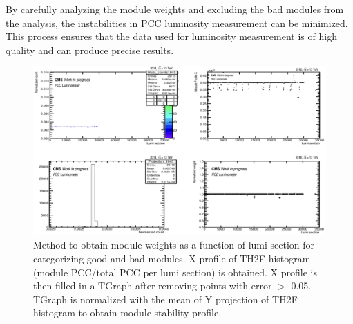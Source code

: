 
By carefully analyzing the module weights and excluding the bad modules from the analysis, the instabilities in PCC luminosity measurement can be minimized. This process ensures that the data used for luminosity measurement is of high quality and can produce precise results.


\begin{figure}[!htp]
\centering
\includegraphics[width=1\textwidth]{ashish_thesis/Module_weight_2.png}
\caption[Module Weight]{%
   Method to obtain module weights as a function of lumi section for categorizing good and bad modules. X profile of TH2F histogram (module PCC/total PCC per lumi section) is obtained. X profile is then filled in a TGraph after removing points with error $>$ 0.05. TGraph is normalized with the mean of Y projection of TH2F histogram to obtain module stability profile.
}
\label{fig:mod_weight}
\end{figure}


